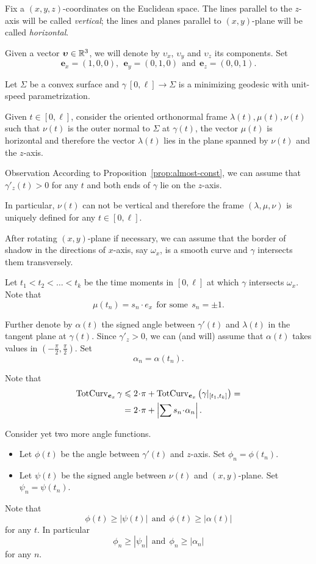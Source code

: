 \documentclass[a4paper,10pt]{amsart}
\begin{document}
Fix a $(x,y,z)$-coordinates on the Euclidean space.
The lines parallel to the $z$-axis will be called \emph{vertical};
the lines and planes parallel to $(x,y)$-plane will be called \emph{horizontal}.

Given a vector $\bm{\upsilon}\in\mathbb{R}^3$, we will denote by $\upsilon_x$, $\upsilon_y$ and $\upsilon_z$ its components.
Set 
\[\bm{e}_x=(1,0,0),\ \ \bm{e}_y=(0,1,0)\ \ \text{and}\ \ \bm{e}_z=(0,0,1).\]

Let $\Sigma$ be a convex surface 
and $\gamma\:[0,\ell]\to \Sigma$ is a minimizing geodesic 
with unit-speed parametrization.

Given $t\in [0,\ell]$, 
consider the oriented orthonormal frame $\lambda(t),\mu(t),\nu(t)$ 
such that $\nu(t)$ is the outer normal to $\Sigma$ at $\gamma(t)$,
the vector $\mu(t)$ is horizontal and therefore the vector $\lambda(t)$ lies in the plane spanned by $\nu(t)$ and the $z$-axis.

\begin{thm}{Observation}
According to Proposition~\ref{prop:almost-const},
we can assume that $\gamma'_z(t)>0$ for any $t$
and both ends of $\gamma$ lie on the $z$-axis.
\end{thm}

In particular, $\nu(t)$ can not be vertical 
and therefore the frame $(\lambda,\mu,\nu)$ is uniquely defined for any $t\in[0,\ell]$.



After rotating $(x,y)$-plane if necessary, 
we can assume that the border of shadow in the directions of $x$-axis, say $\omega_x$, 
is a smooth curve and $\gamma$ intersects them transversely.

Let $t_1<t_2<\dots<t_k$ be the time moments in $[0,\ell]$ 
at which $\gamma$ intersects $\omega_x$.
Note that 
\[\mu(t_n)=s_n\cdot e_x\ \ \text{for some}\ \  s_n=\pm1.\]

Further denote by $\alpha(t)$ the signed angle between $\gamma'(t)$ and $\lambda(t)$ in the tangent plane at $\gamma(t)$.
Since $\gamma'_z>0$,
we can (and will) 
assume that $\alpha(t)$ takes values in $(-\tfrac\pi2,\tfrac\pi2)$.
Set 
\[\alpha_n=\alpha(t_n).\]

Note that  
\begin{align*}
\tc_{\bm{e}_x} \gamma
&\le 
2\cdot\pi+\tc_{\bm{e}_x}\left(\gamma|_{[t_1,t_k]}\right)=
\\
&=2\cdot\pi+\left|\sum s_n\cdot \alpha_n\right|.
\end{align*}

Consider yet two more angle functions.
\begin{itemize}
\item Let $\phi(t)$ be the angle between $\gamma'(t)$ and $z$-axis. Set $\phi_n=\phi(t_n)$.
\item Let $\psi(t)$ be the signed angle between $\nu(t)$ and $(x,y)$-plane. 
Set $\psi_n=\psi(t_n)$.
\end{itemize}
Note that 
\[\phi(t)\ge |\psi(t)|\ \ \text{and}\ \  \phi(t)\ge |\alpha(t)|\] 
for any $t$.
In particular 
\[\phi_n\ge |\psi_n|\ \ \text{and}\ \  \phi_n\ge |\alpha_n|\]
for any $n$.
\end{document}
